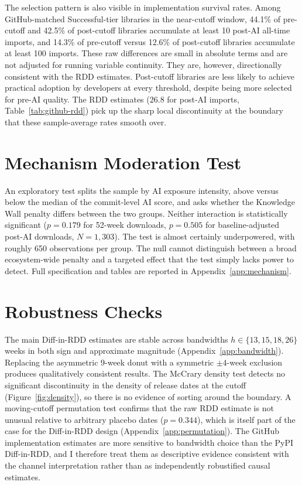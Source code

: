 \documentclass[12pt, a4paper]{report}
\begin{document}
The selection pattern is also visible in implementation survival rates. Among GitHub-matched Successful-tier libraries in the near-cutoff window, 44.1\% of pre-cutoff and 42.5\% of post-cutoff libraries accumulate at least 10 post-AI all-time imports, and 14.3\% of pre-cutoff versus 12.6\% of post-cutoff libraries accumulate at least 100 imports. These raw differences are small in absolute terms and are not adjusted for running variable continuity. They are, however, directionally consistent with the RDD estimates. Post-cutoff libraries are less likely to achieve practical adoption by developers at every threshold, despite being more selected for pre-AI quality. The RDD estimates ($26.8$ for post-AI imports, Table~\ref{tab:github-rdd}) pick up the sharp local discontinuity at the boundary that these sample-average rates smooth over.

\section{Mechanism Moderation Test}\label{sec:results-moderation}
An exploratory test splits the sample by AI exposure intensity, above versus below the median of the commit-level AI score, and asks whether the Knowledge Wall penalty differs between the two groups. Neither interaction is statistically significant ($p = 0.179$ for 52-week downloads, $p = 0.505$ for baseline-adjusted post-AI downloads, $N = 1{,}303$). The test is almost certainly underpowered, with roughly 650 observations per group. The null cannot distinguish between a broad ecosystem-wide penalty and a targeted effect that the test simply lacks power to detect. Full specification and tables are reported in Appendix~\ref{app:mechanism}.

\section{Robustness Checks}\label{sec:results-robustness}

The main Diff-in-RDD estimates are stable across bandwidths $h \in \{13, 15, 18, 26\}$ weeks in both sign and approximate magnitude (Appendix~\ref{app:bandwidth}). Replacing the asymmetric 9-week donut with a symmetric $\pm 4$-week exclusion produces qualitatively consistent results. The McCrary density test detects no significant discontinuity in the density of release dates at the cutoff (Figure~\ref{fig:density}), so there is no evidence of sorting around the boundary. A moving-cutoff permutation test confirms that the raw RDD estimate is not unusual relative to arbitrary placebo dates ($p = 0.344$), which is itself part of the case for the Diff-in-RDD design (Appendix~\ref{app:permutation}). The GitHub implementation estimates are more sensitive to bandwidth choice than the PyPI Diff-in-RDD, and I therefore treat them as descriptive evidence consistent with the channel interpretation rather than as independently robustified causal estimates.
\end{document}
